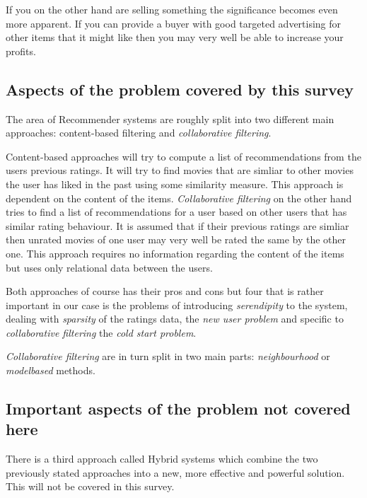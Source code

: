 \documentclass[a4paper,11pt]{article}
\begin{document}
If you on the other hand are selling something the significance becomes even more apparent. If
you can provide a buyer with good targeted advertising for other items that it might like then
you may very well be able to increase your profits.

\subsection{Aspects of the problem covered by this survey}
The area of Recommender systems are roughly split into two different main approaches\cite{1423975}:
content-based filtering and \emph{collaborative filtering}.

Content-based approaches will try to compute a list of recommendations from the users previous ratings. 
It will try to find movies that are simliar to other movies the user has liked in the past using some
similarity measure. This approach is dependent on the content of the items. \emph{Collaborative filtering}
on the other hand tries to find a list of recommendations for a user based on other users that has similar
rating behaviour. It is assumed that if their previous ratings are simliar then unrated movies of one user
may very well be rated the same by the other one. This approach requires no information regarding the content
of the items but uses only relational data between the users.

Both approaches of course has their pros and cons but four that is rather important in our case is
the problems of introducing \emph{serendipity} to the system, dealing with \emph{sparsity} of the ratings data, the
\emph{new user problem} and specific to \emph{collaborative filtering} the \emph{cold start problem}.

\emph{Collaborative filtering} are in turn split in two main parts: \emph{neighbourhood} or \emph{model\-based} methods.

\subsection{Important aspects of the problem not covered here}
There is a third approach called Hybrid systems which combine the two previously stated approaches into a new,
more effective and powerful solution. This will not be covered in this survey.
\end{document}
